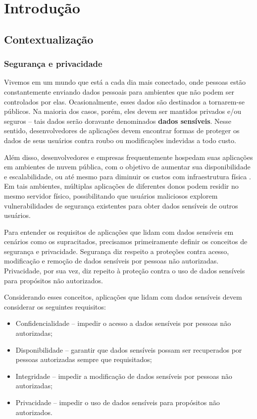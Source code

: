 \chapter{Introdução}
\label{chapter:intro}

\section{Contextualização}
\label{sec:intro_contextualizacao}

\subsection{Segurança e privacidade}
\label{subsec:intro_contextualizacao_seguranca_privacidade}

Vivemos em um mundo que está a cada dia mais conectado, onde pessoas estão
constantemente enviando dados pessoais para ambientes que não podem ser
controlados por elas. Ocasionalmente, esses dados são destinados a tornarem-se
públicos. Na maioria dos casos, porém, eles devem ser mantidos privados e/ou
seguros -- tais dados serão doravante denominados \textbf{dados sensíveis}.
Nesse sentido, desenvolvedores de aplicações devem encontrar formas de proteger
os dados de seus usuários contra roubo ou modificações indevidas a todo custo.

Além disso, desenvolvedores e empresas frequentemente hospedam suas aplicações
em ambientes de nuvem pública, com o objetivo de aumentar sua disponibilidade e
escalabilidade, ou até mesmo para diminuir os custos com infraestrutura física
\cite{armbrust2010view}. Em tais ambientes, múltiplas aplicações de diferentes
donos podem residir no mesmo servidor físico, possibilitando que usuários
maliciosos explorem vulnerabilidades de segurança existentes para obter dados
sensíveis de outros usuários.

Para  entender os requisitos de aplicações que lidam com dados sensíveis em
cenários como os supracitados, precisamos primeiramente definir os conceitos de
segurança e privacidade. Segurança diz respeito a proteções contra acesso,
modificação e remoção de dados sensíveis por pessoas não autorizadas.
Privacidade, por sua vez, diz repeito à proteção contra o uso de dados
sensíveis para propósitos não autorizados.

Considerando esses conceitos, aplicações que lidam com dados sensíveis devem
considerar os seguintes requisitos:

\begin{itemize}
    \item Confidencialidade -- impedir o acesso a dados sensíveis por pessoas
    não autorizadas;
    \item Disponibilidade -- garantir que dados sensíveis possam ser recuperados
    por pessoas autorizadas sempre que requisitados;
    \item Integridade -- impedir a modificação de dados sensíveis por pessoas
    não autorizadas;
    \item Privacidade -- impedir o uso de dados sensíveis para propósitos não
    autorizados.
\end{itemize}

